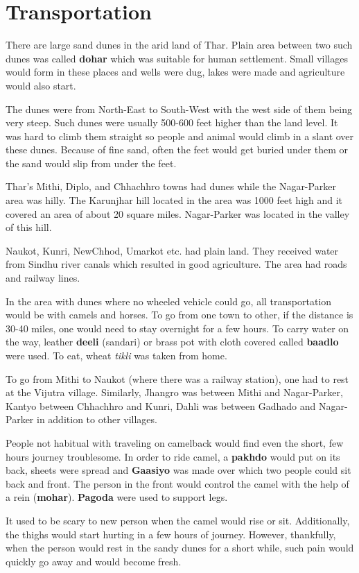 \chapter{Transportation}
There are large sand dunes in the arid land of Thar. Plain area between two such
dunes was called \textbf{dohar} which was suitable for human settlement. Small
villages would form in these places and wells were dug, lakes were made and
agriculture would also start.

The dunes were from North-East to South-West with the west side of them being
very steep. Such dunes were usually 500-600 feet higher than the land level. It
was hard to climb them straight so people and animal would climb in a slant
over these dunes. Because of fine sand, often the feet would get buried under
them or the sand would slip from under the feet.

Thar's Mithi, Diplo, and Chhachhro towns had dunes while the Nagar-Parker area
was hilly. The Karunjhar hill located in the area was 1000 feet high and it
covered an area of about 20 square miles. Nagar-Parker was located in the
valley of this hill.

Naukot, Kunri, NewChhod, Umarkot etc. had plain land. They received water from
Sindhu river canals which resulted in good agriculture. The area had roads and
railway lines. 

In the area with dunes where no wheeled vehicle could go, all transportation
would be with camels and horses. To go from one town to other, if the distance
is 30-40 miles, one would need to stay overnight for a few hours. To carry
water on the way, leather \textbf{deeli} (sandari) or brass pot with cloth covered
called \textbf{baadlo} were used. To eat, wheat \textit{tikli} was taken
from home.

To go from Mithi to Naukot (where there was a railway station), one had to rest
at the Vijutra village. Similarly, Jhangro was between Mithi and Nagar-Parker,
Kantyo between Chhachhro and Kunri, Dahli was between Gadhado and Nagar-Parker
in addition to other villages.

People not habitual with traveling on camelback would find even the short, few
hours journey troublesome. In order to ride camel, a \textbf{pakhdo} would put
on its back, sheets were spread and \textbf{Gaasiyo} was made over which two
people could sit back and front. The person in the front would control the
camel with the help of a rein (\textbf{mohar}). \textbf{Pagoda} were used to
support legs.

It used to be scary to new person when the camel would rise or sit.
Additionally, the thighs would start hurting in a few hours of journey.
However, thankfully, when the person would rest in the sandy dunes for a short
while, such pain would quickly go away and would become fresh.

